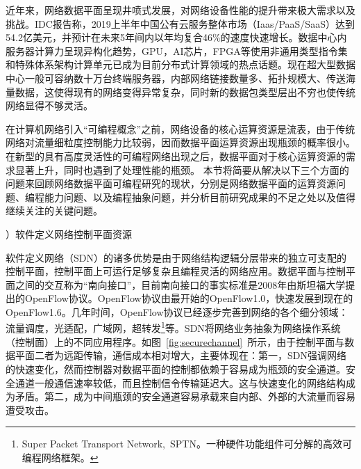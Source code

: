 \label{chap12}

近年来，网络数据平面呈现井喷式发展，对网络设备性能的提升带来极大需求以及挑战。IDC报告称，2019上半年中国公有云服务整体市场（Iaas/PaaS/SaaS）达到54.2亿美元，并预计在未来5年间内以年均复合46\%的速度快速增长。数据中心内服务器计算力呈现异构化趋势，GPU，AI芯片，FPGA等使用非通用类型指令集和特殊体系架构计算单元已成为目前分布式计算领域的热点话题。现在超大型数据中心一般可容纳数十万台终端服务器，内部网络链接数量多、拓扑规模大、传送海量数据，这使得现有的网络变得异常复杂，同时新的数据包类型层出不穷也使传统网络显得不够灵活。

在计算机网络引入“可编程概念”之前，网络设备的核心运算资源是流表，由于传统网络对流量细粒度控制能力比较弱，因而数据平面运算资源出现瓶颈的概率很小。在新型的具有高度灵活性的可编程网络出现之后，数据平面对于核心运算资源的需求显著上升，同时也遇到了处理性能的瓶颈。
本节将简要从解决以下三个方面的问题来回顾网络数据平面可编程研究的现状，分别是网络数据平面的运算资源问题、编程能力问题、以及编程抽象问题，并分析目前研究成果的不足之处以及值得继续关注的关键问题。




\label{chap121}

{）软件定义网络控制平面资源}




软件定义网络（SDN）的诸多优势是由于网络结构逻辑分层带来的独立可支配的控制平面，控制平面上可运行足够复杂且编程灵活的网络应用。数据平面与控制平面之间的交互称为“南向接口”，目前南向接口的事实标准是2008年由斯坦福大学提出的OpenFlow协议。OpenFlow协议由最开始的OpenFlow1.0，快速发展到现在的OpenFlow1.6。几年时间，OpenFlow协议已经逐步完善到网络的各个细分领域：流量调度，光适配，广域网，超转发\footnote{Super Packet Transport Network,~SPTN。一种硬件功能组件可分解的高效可编程网络框架。}等。SDN将网络业务抽象为网络操作系统（控制面）上的不同应用程序。如图~\ref{fig:securechannel}~所示，由于控制平面与数据平面二者为远距传输，通信成本相对增大，主要体现在：第一，SDN强调网络的快速变化，然而控制器对数据平面的控制都依赖于容易成为瓶颈的安全通道。安全通道一般通信速率较低，而且控制信令传输延迟大。这与快速变化的网络结构成为矛盾。第二，成为中间瓶颈的安全通道容易承载来自内部、外部的大流量而容易遭受攻击。



